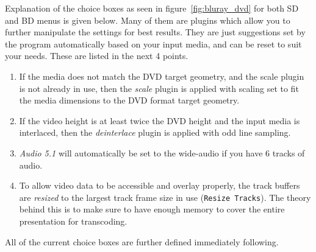 Explanation of the choice boxes as seen in figure~\ref{fig:bluray_dvd} for both SD and BD menus is given below.  Many of them are plugins which allow you to further manipulate the settings for best results.  They are just suggestions set by the program automatically based on your input media, and can be reset to suit your needs.  These are listed in the next 4 points.

\begin{enumerate}
    \item If the media does not match the DVD target geometry, and the scale plugin is not already in use, then the \textit{scale} plugin is applied with scaling set to fit the media dimensions to the DVD format target geometry.
    \item If the video height is at least twice the DVD height and the input media is interlaced, then the \textit{deinterlace} plugin is applied with odd line sampling.
    \item \textit{Audio 5.1} will automatically be set to the wide-audio if you have 6 tracks of audio.
    \item To allow video data to be accessible and overlay properly, the track buffers are \textit{resized} to the largest track frame size in use (\texttt{Resize Tracks}). The theory behind this is to make sure to have enough memory to cover the entire presentation for transcoding.
\end{enumerate}

\noindent All of the current choice boxes are further defined immediately following.

